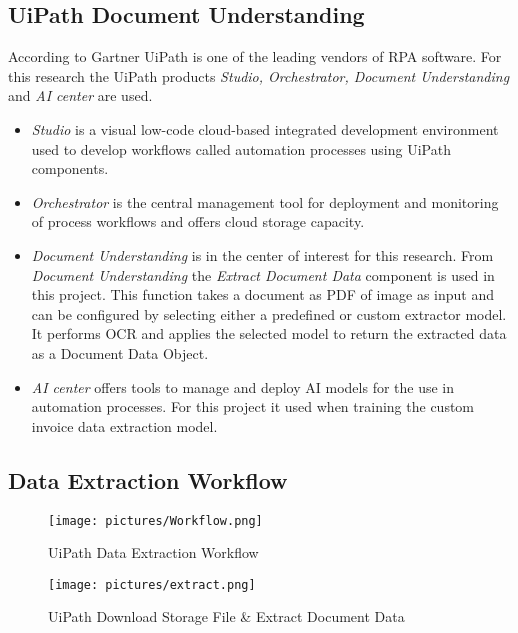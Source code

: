 \subsection{UiPath Document Understanding}
According to Gartner \cite{gartner2023magicquadrant} UiPath is one of the leading vendors of \acl{RPA} software. For this research the UiPath products \textit{Studio, Orchestrator, Document Understanding} and \textit{AI center} are used. 
\begin{itemize}
    \item \textit{Studio} is a visual low-code cloud-based integrated development environment used to develop workflows called automation processes using UiPath components. 
    \item \textit{Orchestrator} is the central management tool for deployment and monitoring of process workflows and offers cloud storage capacity. 
    \item \textit{Document Understanding} is in the center of interest for this research. From \textit{Document Understanding} the \textit{Extract Document Data} component is used in this project. This function takes a document as PDF of image as input and can be configured by selecting either a predefined or custom extractor model. It performs \ac{OCR} and applies the selected model to return the extracted data as a Document Data Object.
    \item \textit{AI center} offers tools to manage and deploy \ac{AI} models for the use in automation processes. For this project it used when training the custom invoice data extraction model. \cite{uipath}

\end{itemize}
\subsection{Data Extraction Workflow}
\begin{figure}[ht]
    \centering 
    \texttt{[image: pictures/Workflow.png]}
    \caption{UiPath Data Extraction Workflow}
    \label{pic:UiPath_1}    %
\end{figure}
\begin{figure}[ht]
    \centering 
    \texttt{[image: pictures/extract.png]}
    \caption{UiPath Download Storage File \& Extract Document Data}
    \label{pic:UiPath_2}    %
\end{figure}

